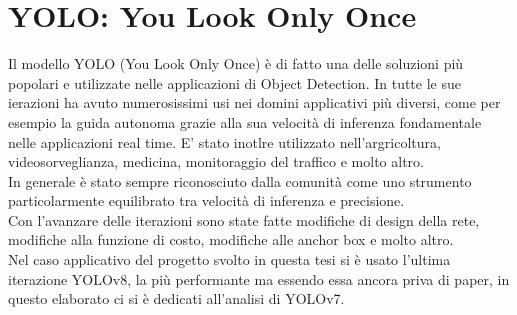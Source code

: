 \documentclass[12pt,a4paper,openright,twoside]{report}
\begin{document}
\section{YOLO: You Look Only Once}
Il modello YOLO (You Look Only Once) è di fatto una delle soluzioni più popolari e utilizzate nelle applicazioni di Object Detection. In tutte le sue ierazioni ha avuto numerosissimi usi nei domini applicativi più diversi, come per esempio la guida autonoma grazie alla sua velocità di inferenza fondamentale nelle applicazioni real time. E' stato inotlre utilizzato nell'argricoltura, videosorveglianza, medicina, monitoraggio del traffico e molto altro.\\
In generale è stato sempre riconosciuto dalla comunità come uno strumento particolarmente equilibrato tra velocità di inferenza e precisione.\\
Con l'avanzare delle iterazioni sono state fatte modifiche di design della rete, modifiche alla funzione di costo, modifiche alle anchor box e molto altro. 
\\Nel caso applicativo del progetto svolto in questa tesi si è usato l'ultima iterazione YOLOv8, la più performante ma essendo essa ancora priva di paper, in questo elaborato ci si è dedicati all'analisi di YOLOv7.
\end{document}
